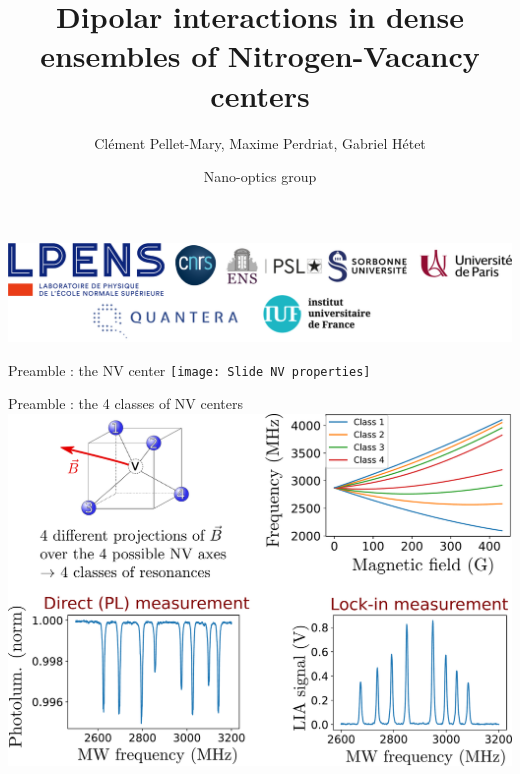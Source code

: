 \documentclass{beamer}
\title{Dipolar interactions in dense ensembles of Nitrogen-Vacancy centers}
\author{Clément Pellet-Mary, Maxime Perdriat, Gabriel Hétet}
\date{Nano-optics group}
\begin{document}
\begin{frame}
\maketitle
\begin{center}
\includegraphics[width=\textwidth,height=0.3\textheight,keepaspectratio]{logos}
\end{center}
\end{frame}
\begin{frame}{Preamble : the NV center}
\centering
\texttt{[image: Slide  NV properties]}
\end{frame}

\begin{frame}{Preamble : the 4 classes of NV centers}
\centering
\includegraphics[width=\textwidth,height=0.9\textheight,keepaspectratio]{slide ODMR 4 classes}
\end{frame}
\end{document}

